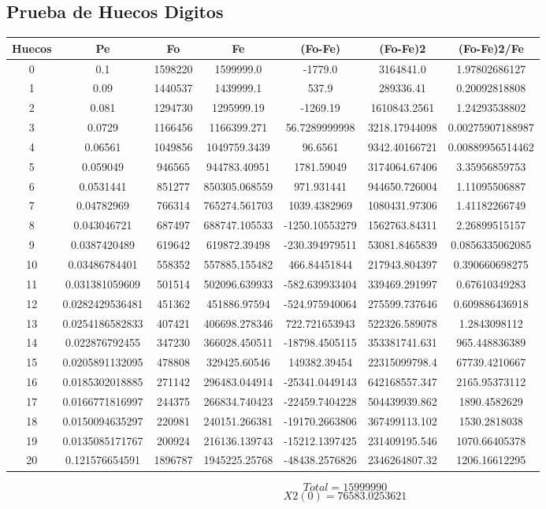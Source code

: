\documentclass{article}
\begin{document}
\subsection{Prueba de Huecos Digitos}
\begin{tabular}{|c|c|c|c|c|c|c|}
Huecos&Pe&Fo&Fe&(Fo{-}Fe)&(Fo{-}Fe)2&(Fo{-}Fe)2/Fe\\
\hline
0&0.1&1598220&1599999.0&{-}1779.0&3164841.0&1.97802686127\\
\hline
1&0.09&1440537&1439999.1&537.9&289336.41&0.20092818808\\
\hline
2&0.081&1294730&1295999.19&{-}1269.19&1610843.2561&1.24293538802\\
\hline
3&0.0729&1166456&1166399.271&56.7289999998&3218.17944098&0.00275907188987\\
\hline
4&0.06561&1049856&1049759.3439&96.6561&9342.40166721&0.00889956514462\\
\hline
5&0.059049&946565&944783.40951&1781.59049&3174064.67406&3.35956859753\\
\hline
6&0.0531441&851277&850305.068559&971.931441&944650.726004&1.11095506887\\
\hline
7&0.04782969&766314&765274.561703&1039.4382969&1080431.97306&1.41182266749\\
\hline
8&0.043046721&687497&688747.105533&{-}1250.10553279&1562763.84311&2.26899515157\\
\hline
9&0.0387420489&619642&619872.39498&{-}230.394979511&53081.8465839&0.0856335062085\\
\hline
10&0.03486784401&558352&557885.155482&466.84451844&217943.804397&0.390660698275\\
\hline
11&0.031381059609&501514&502096.639933&{-}582.639933404&339469.291997&0.67610349283\\
\hline
12&0.0282429536481&451362&451886.97594&{-}524.975940064&275599.737646&0.609886436918\\
\hline
13&0.0254186582833&407421&406698.278346&722.721653943&522326.589078&1.2843098112\\
\hline
14&0.022876792455&347230&366028.450511&{-}18798.4505115&353381741.631&965.448836389\\
\hline
15&0.0205891132095&478808&329425.60546&149382.39454&22315099798.4&67739.4210667\\
\hline
16&0.0185302018885&271142&296483.044914&{-}25341.0449143&642168557.347&2165.95373112\\
\hline
17&0.0166771816997&244375&266834.740423&{-}22459.7404228&504439939.862&1890.4582629\\
\hline
18&0.0150094635297&220981&240151.266381&{-}19170.2663806&367499113.102&1530.2818038\\
\hline
19&0.0135085171767&200924&216136.139743&{-}15212.1397425&231409195.546&1070.66405378\\
\hline
20&0.121576654591&1896787&1945225.25768&{-}48438.2576826&2346264807.32&1206.16612295\\
\end{tabular}
$$
Total = 15999990
$$
$$
X2(0) = 76583.0253621
$$
\end{document}
